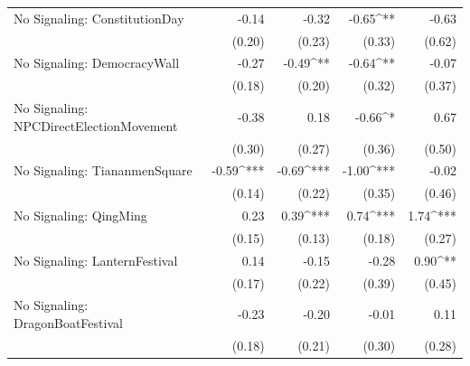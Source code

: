\begin{table}
\begin{center}
\begin{tabular}{l D{.}{.}{6.5} D{.}{.}{6.5} D{.}{.}{6.5} D{.}{.}{6.5}}
No Signaling: ConstitutionDay             & -0.14                   & -0.32                   & -0.65^{**}              & -0.63                   \\
                                          & (0.20)                  & (0.23)                  & (0.33)                  & (0.62)                  \\
No Signaling: DemocracyWall               & -0.27                   & -0.49^{**}              & -0.64^{**}              & -0.07                   \\
                                          & (0.18)                  & (0.20)                  & (0.32)                  & (0.37)                  \\
No Signaling: NPCDirectElectionMovement   & -0.38                   & 0.18                    & -0.66^{*}               & 0.67                    \\
                                          & (0.30)                  & (0.27)                  & (0.36)                  & (0.50)                  \\
No Signaling: TiananmenSquare             & -0.59^{***}             & -0.69^{***}             & -1.00^{***}             & -0.02                   \\
                                          & (0.14)                  & (0.22)                  & (0.35)                  & (0.46)                  \\
No Signaling: QingMing                    & 0.23                    & 0.39^{***}              & 0.74^{***}              & 1.74^{***}              \\
                                          & (0.15)                  & (0.13)                  & (0.18)                  & (0.27)                  \\
No Signaling: LanternFestival             & 0.14                    & -0.15                   & -0.28                   & 0.90^{**}               \\
                                          & (0.17)                  & (0.22)                  & (0.39)                  & (0.45)                  \\
No Signaling: DragonBoatFestival          & -0.23                   & -0.20                   & -0.01                   & 0.11                    \\
                                          & (0.18)                  & (0.21)                  & (0.30)                  & (0.28)                  \\

\end{tabular}
\end{center}
\end{table}
